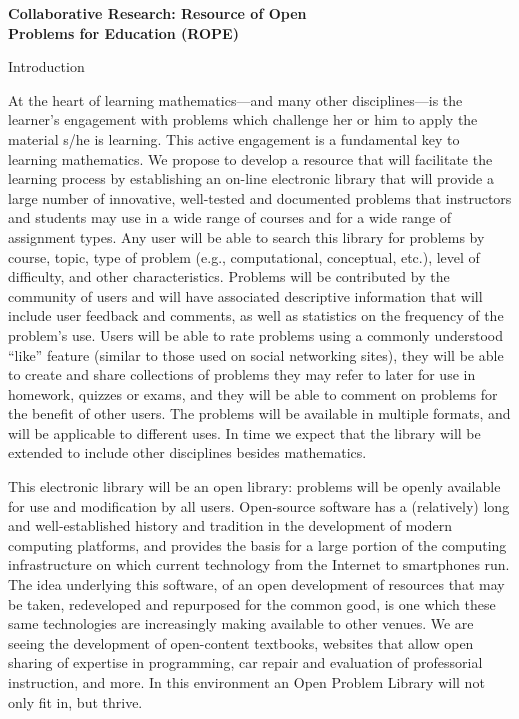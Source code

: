 \documentclass[11pt]{article}
\begin{document}
\begin{center}
{\Large \textbf{Collaborative Research: Resource of Open\\
Problems for Education (ROPE)}}
\end{center}

\begin{section}{Introduction}

At the heart of learning mathematics---and many other disciplines---is the
learner's engagement with problems which challenge her or him to apply the
material s/he is learning.  This active engagement is a fundamental key to
learning mathematics.  We propose to develop a resource that will
facilitate the learning process by establishing an on-line electronic
library that will provide a large number of innovative, well-tested and
documented problems that instructors and students may use in a wide range
of courses and for a wide range of assignment types.  Any user will be
able to search this library for problems by course, topic, type of problem
(e.g., computational, conceptual, etc.), level of difficulty, and other
characteristics.  Problems will be contributed by the community of users
and will have associated descriptive information that will include user
feedback and comments, as well as statistics on the frequency of the
problem's use.  Users will be able to rate problems using a commonly
understood ``like'' feature (similar to those used on social networking
sites), they will be able to create and share collections of problems they
may refer to later for use in homework, quizzes or exams, and they will be
able to comment on problems for the benefit of other users.  The problems
will be available in multiple formats, and will be applicable to different
uses.  In time we expect that the library will be extended to include
other disciplines besides mathematics.

This electronic library will be an open library: problems will be openly
available for use and modification by all users.  Open-source software has
a (relatively) long and well-established history and tradition in the
development of modern computing platforms, and provides the basis for a
large portion of the computing infrastructure on which current technology
from the Internet to smartphones run.  The idea underlying this software,
of an open development of resources that may be taken, redeveloped and
repurposed for the common good, is one which these same technologies are
increasingly making available to other venues. We are seeing the
development of open-content textbooks, websites that allow open sharing of
expertise in programming, car repair and evaluation of professorial
instruction, and more.  In this environment an Open Problem Library will
not only fit in, but thrive.


\end{section}
\end{document}

